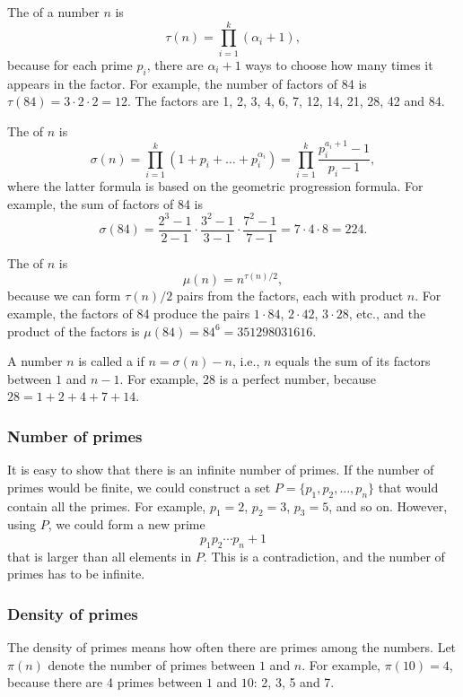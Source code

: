 The  of a number $n$ is
\[\tau(n)=\prod_{i=1}^k (\alpha_i+1),\]
because for each prime $p_i$, there are
$\alpha_i+1$ ways to choose how many times
it appears in the factor.
For example, the number of factors
of 84 is
$\tau(84)=3 \cdot 2 \cdot 2 = 12$.
The factors are
1, 2, 3, 4, 6, 7, 12, 14, 21, 28, 42 and 84.

The  of $n$ is
\[\sigma(n)=\prod_{i=1}^k (1+p_i+\ldots+p_i^{\alpha_i}) = \prod_{i=1}^k \frac{p_i^{a_i+1}-1}{p_i-1},\]
where the latter formula is based on the geometric progression formula.
For example, the sum of factors of 84 is
\[\sigma(84)=\frac{2^3-1}{2-1} \cdot \frac{3^2-1}{3-1} \cdot \frac{7^2-1}{7-1} = 7 \cdot 4 \cdot 8 = 224.\]

The  of $n$ is
\[\mu(n)=n^{\tau(n)/2},\]
because we can form $\tau(n)/2$ pairs from the factors,
each with product $n$.
For example, the factors of 84
produce the pairs
$1 \cdot 84$, $2 \cdot 42$, $3 \cdot 28$, etc.,
and the product of the factors is $\mu(84)=84^6=351298031616$.


A number $n$ is called a  if $n=\sigma(n)-n$,
i.e., $n$ equals the sum of its factors
between $1$ and $n-1$.
For example, 28 is a perfect number,
because $28=1+2+4+7+14$.

\subsubsection{Number of primes}

It is easy to show that there is an infinite number
of primes.
If the number of primes would be finite,
we could construct a set $P=\{p_1,p_2,\ldots,p_n\}$
that would contain all the primes.
For example, $p_1=2$, $p_2=3$, $p_3=5$, and so on.
However, using $P$, we could form a new prime
\[p_1 p_2 \cdots p_n+1\]
that is larger than all elements in $P$.
This is a contradiction, and the number of primes
has to be infinite.

\subsubsection{Density of primes}

The density of primes means how often there are primes
among the numbers.
Let $\pi(n)$ denote the number of primes between
$1$ and $n$. For example, $\pi(10)=4$, because
there are 4 primes between $1$ and $10$: 2, 3, 5 and 7.

